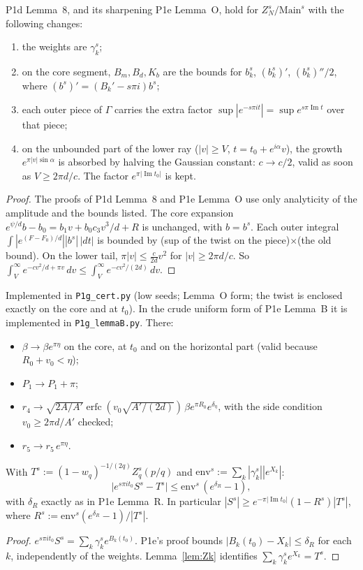 \documentclass[11pt]{article}
\theoremstyle{definition}\newtheorem{definition}[theorem]{Definition}
\theoremstyle{remark}\newtheorem{remark}[theorem]{Remark}
\begin{document}
\begin{lemma}\label{lem:lap}
P1d Lemma~8, and its sharpening P1e Lemma~O, hold for $Z^s_N/\mathrm{Main}^s$ with the following changes:
\begin{enumerate}
\item the weights are $\gamma^s_k$;
\item on the core segment, $B_m,B_d,K_b$ are the bounds for $b^s_k$, $(b^s_k)'$, $(b^s_k)''/2$, where $(b^s)'=(B_k'-s\pi i)b^s$;
\item each outer piece of $\Gamma$ carries the extra factor $\sup|e^{-s\pi it}|=\sup e^{s\pi\operatorname{Im}t}$ over that piece;
\item on the unbounded part of the lower ray ($|v|\ge V$, $t=t_0+e^{i\alpha}v$), the growth $e^{\pi|v|\sin\alpha}$ is absorbed by halving the Gaussian constant: $c\to c/2$, valid as soon as $V\ge2\pi d/c$. The factor $e^{\pi|\operatorname{Im}t_0|}$ is kept.
\end{enumerate}
\end{lemma}
\begin{proof}
The proofs of P1d Lemma~8 and P1e Lemma~O use only analyticity of the amplitude and the bounds listed.
The core expansion $e^{\psi/d}b-b_0=b_1v+b_0c_3v^3/d+R$ is unchanged, with $b=b^s$.
Each outer integral $\int|e^{(F-F_0)/d}||b^s|\,|dt|$ is bounded by (sup of the twist on the piece)$\times$(the old bound).
On the lower tail, $\pi|v|\le\frac c{2d}v^2$ for $|v|\ge2\pi d/c$. So $\int_V^\infty e^{-cv^2/d+\pi v}\,dv\le\int_V^\infty e^{-cv^2/(2d)}\,dv$.
\end{proof}
Implemented in \texttt{P1g\_cert.py} (low seeds; Lemma~O form; the twist is enclosed exactly on the core and at $t_0$). In the crude uniform form of P1e Lemma~B it is implemented in \texttt{P1g\_lemmaB.py}. There:
\begin{itemize}
\item $\beta\to\beta e^{\pi\eta}$ on the core, at $t_0$ and on the horizontal part (valid because $R_0+v_0<\eta$);
\item $P_1\to P_1+\pi$;
\item $r_4\to\sqrt{2A/A'}\operatorname{erfc}(v_0\sqrt{A'/(2d)})\,\beta e^{\pi R_0}e^{\delta_\eta}$, with the side condition $v_0\ge2\pi d/A'$ checked;
\item $r_5\to r_5\,e^{\pi\eta}$.
\end{itemize}

\begin{lemma}[R$^\pm$; PROVED]\label{lem:R}
With $T^s:=(1-w_q)^{-1/(2q)}Z^s_q(p/q)$ and $\mathrm{env}^s:=\sum_k|\gamma^s_k||e^{X_k}|$:
\[\Big|e^{s\pi it_0}S^s-T^s\Big|\le\mathrm{env}^s\,(e^{\delta_R}-1),\]
with $\delta_R$ exactly as in P1e Lemma~R. In particular $|S^s|\ge e^{-\pi|\operatorname{Im}t_0|}(1-R^s)|T^s|$, where $R^s:=\mathrm{env}^s(e^{\delta_R}-1)/|T^s|$.
\end{lemma}
\begin{proof}
$e^{s\pi it_0}S^s=\sum_k\gamma^s_ke^{B_k(t_0)}$. P1e's proof bounds $|B_k(t_0)-X_k|\le\delta_R$ for each $k$, independently of the weights. Lemma~\ref{lem:Zk} identifies $\sum_k\gamma^s_ke^{X_k}=T^s$.
\end{proof}
\end{document}
